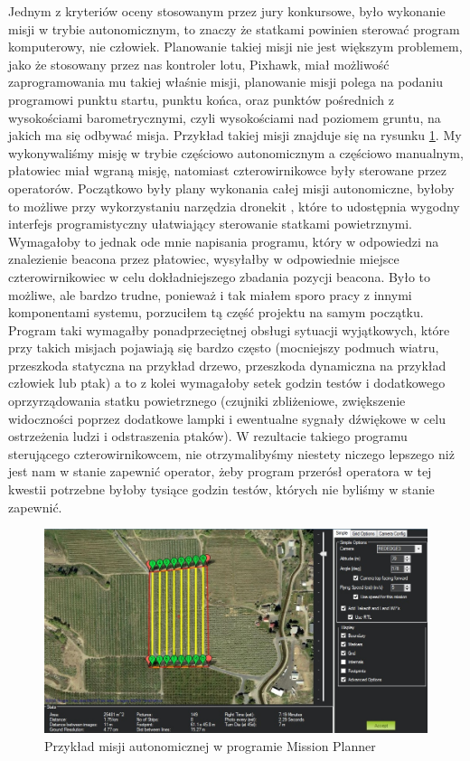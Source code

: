 Jednym z kryteriów oceny stosowanym przez jury konkursowe, było wykonanie misji w trybie autonomicznym, to znaczy że statkami powinien sterować program komputerowy, nie człowiek. Planowanie takiej misji nie jest większym problemem, jako że stosowany przez nas kontroler lotu, Pixhawk, miał możliwość zaprogramowania mu takiej właśnie misji, planowanie misji polega na podaniu programowi punktu startu, punktu końca, oraz punktów pośrednich z wysokościami barometrycznymi, czyli wysokościami nad poziomem gruntu, na jakich ma się odbywać misja. Przykład takiej misji znajduje się na rysunku \ref{fig:misja}. My wykonywaliśmy misję w trybie częściowo autonomicznym a częściowo manualnym, płatowiec miał wgraną misję, natomiast czterowirnikowce były sterowane przez operatorów. Początkowo były plany wykonania całej misji autonomiczne, byłoby to możliwe przy wykorzystaniu narzędzia dronekit \cite{dronekit}, które to udostępnia wygodny interfejs programistyczny ułatwiający sterowanie statkami powietrznymi. Wymagałoby to jednak ode mnie napisania programu, który w odpowiedzi na znalezienie beacona przez płatowiec, wysyłałby w odpowiednie miejsce czterowirnikowiec w celu dokładniejszego zbadania pozycji beacona. Było to możliwe, ale bardzo trudne, ponieważ i tak miałem sporo pracy z innymi komponentami systemu, porzuciłem tą część projektu na samym początku. Program taki wymagałby ponadprzeciętnej obsługi sytuacji wyjątkowych, które przy takich misjach pojawiają się bardzo często (mocniejszy podmuch wiatru, przeszkoda statyczna na przykład drzewo, przeszkoda dynamiczna na przykład człowiek lub ptak) a to z kolei wymagałoby setek godzin testów i dodatkowego oprzyrządowania statku powietrznego (czujniki zbliżeniowe, zwiększenie widoczności poprzez dodatkowe lampki i ewentualne sygnały dźwiękowe w celu ostrzeżenia ludzi i odstraszenia ptaków). W rezultacie takiego programu sterującego czterowirnikowcem, nie otrzymalibyśmy niestety niczego lepszego niż jest nam w stanie zapewnić operator, żeby program przerósł operatora w tej kwestii potrzebne byłoby tysiące godzin testów, których nie byliśmy w stanie zapewnić.

\begin{figure}[!th]
    \centering
    \includegraphics[width=15cm]{zalaczniki/obrazy/misja.jpg}
    \caption{Przykład misji autonomicznej w programie Mission Planner}
    \label{fig:misja}
\end{figure}

